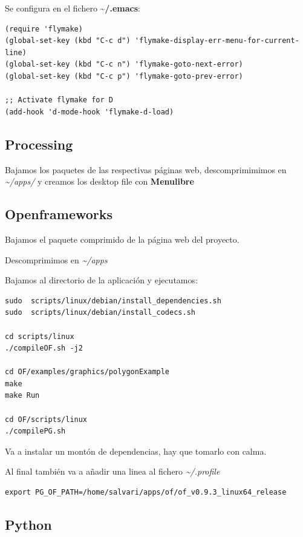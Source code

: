 \documentclass[12pt,spanish,]{article}
\begin{document}
Se configura en el fichero \textbf{\textasciitilde{}/.emacs}:

\begin{verbatim}
(require 'flymake)
(global-set-key (kbd "C-c d") 'flymake-display-err-menu-for-current-line)
(global-set-key (kbd "C-c n") 'flymake-goto-next-error)
(global-set-key (kbd "C-c p") 'flymake-goto-prev-error)

;; Activate flymake for D
(add-hook 'd-mode-hook 'flymake-d-load)
\end{verbatim}

\subsection{Processing}\label{processing}

Bajamos los paquetes de las respectivas páginas web, descomprimimimos en
\emph{\textasciitilde{}/apps/} y creamos los desktop file con
\textbf{Menulibre}

\subsection{Openframeworks}\label{openframeworks}

Bajamos el paquete comprimido de la página web del proyecto.

Descomprimimos en \emph{\textasciitilde{}/apps}

Bajamos al directorio de la aplicación y ejecutamos:

\begin{verbatim}
sudo  scripts/linux/debian/install_dependencies.sh
sudo  scripts/linux/debian/install_codecs.sh

cd scripts/linux
./compileOF.sh -j2

cd OF/examples/graphics/polygonExample
make
make Run

cd OF/scripts/linux
./compilePG.sh
\end{verbatim}

Va a instalar un montón de dependencias, hay que tomarlo con calma.

Al final también va a añadir una linea al fichero
\emph{\textasciitilde{}/.profile}

\begin{verbatim}
export PG_OF_PATH=/home/salvari/apps/of/of_v0.9.3_linux64_release
\end{verbatim}

\subsection{Python}\label{python}
\end{document}
